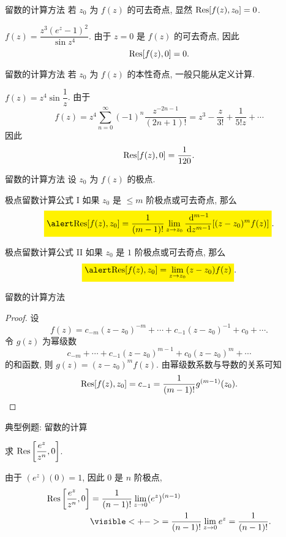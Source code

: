 \begin{frame}{留数的计算方法}
\onslide<+->
若 $z_0$ 为 $f(z)$ 的可去奇点, 显然 ${\mathrm{Res}}[f(z),z_0]=0$.
\begin{example}
$f(z)=\dfrac{z^3(e^z-1)^2}{\sin z^4}$.
\onslide<+->
由于 $z=0$ 是 $f(z)$ 的可去奇点,
\onslide<+->
因此
\[{\mathrm{Res}}[f(z),0]=0.\]
\end{example}
\end{frame}


\begin{frame}{留数的计算方法}
\onslide<+->
若 $z_0$ 为 $f(z)$ 的本性奇点, 一般只能从定义计算.
\begin{example}
$f(z)=z^4\sin\dfrac1z$.
\onslide<+->
由于
\[f(z)=z^4\sum_{n=0}^\infty(-1)^n\frac{z^{-2n-1}}{(2n+1)!}
=z^3-\frac z{3!}+\frac1{5!z}+\cdots\]
\onslide<+->
因此
\[{\mathrm{Res}}[f(z),0]=\frac1{120}.\]
\end{example}
\end{frame}


\begin{frame}{留数的计算方法}
设 $z_0$ 为 $f(z)$ 的极点.
\begin{block}{极点留数计算公式 I}
如果 $z_0$ 是 $\le m$ 阶极点或可去奇点, 那么
\[\aboxeq{\Res[f(z),z_0]=\frac1{(m-1)!}\lim_{z\to z_0}\frac{\diff^{m-1}}{\diff z^{m-1}}[(z-z_0)^mf(z)]}.\]
\end{block}

\begin{block}{极点留数计算公式 II}
如果 $z_0$ 是 $1$ 阶极点或可去奇点, 那么
\[\aboxeq{\Res[f(z),z_0]=\lim\limits_{z\to z_0}(z-z_0)f(z)}.\]
\end{block}
\end{frame}


\begin{frame}{留数的计算方法}
\begin{proof}
设
\[f(z)=c_{-m}(z-z_0)^{-m}+\cdots+c_{-1}(z-z_0)^{-1}+c_0+\cdots.\]
\onslide<+->
令 $g(z)$ 为幂级数
\[c_{-m}+\cdots+c_{-1}(z-z_0)^{m-1}+c_0(z-z_0)^m+\cdots\]
的和函数, 则 $g(z)=(z-z_0)^mf(z)$.
\onslide<+->
由幂级数系数与导数的关系可知
\[{\mathrm{Res}}[f(z),z_0]=c_{-1}=\dfrac1{(m-1)!}g^{(m-1)}(z_0).\qedhere\]
\end{proof}
\end{frame}


\begin{frame}{典型例题: 留数的计算}
\begin{example}
求 ${\mathrm{Res}}\left[\dfrac{e^z}{z^n},0\right]$.
\end{example}
\begin{solution}
由于 $(e^z)(0)=1$, 因此 $0$ 是 $n$ 阶极点,
\onslide<+->
\begin{align*}
\Res\left[\frac{e^z}{z^n},0\right]&=\frac1{(n-1)!}\lim_{z\to0}(e^z)^{(n-1)}\\
&\visible<+->{=\frac1{(n-1)!}\lim_{z\to0}e^z=\frac1{(n-1)!}.}
\end{align*}
\end{solution}
\end{frame}


